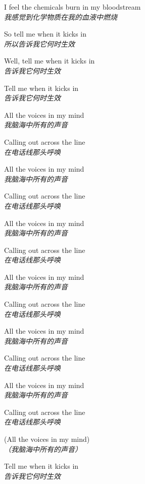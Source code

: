 \begin{spacing}{1.5}
\begin{flushleft}
I feel the chemicals burn in my bloodstream\\
\textit{我感觉到化学物质在我的血液中燃烧}\lyricspace

So tell me when it kicks in\\
\textit{所以告诉我它何时生效}\lyricspace

Well, tell me when it kicks in\\
\textit{告诉我它何时生效}\lyricspace

Tell me when it kicks in\\
\textit{告诉我它何时生效}\lyricspace

All the voices in my mind\\
\textit{我脑海中所有的声音}\lyricspace

Calling out across the line\\
\textit{在电话线那头呼唤}\lyricspace

All the voices in my mind\\
\textit{我脑海中所有的声音}\lyricspace

Calling out across the line\\
\textit{在电话线那头呼唤}\lyricspace

All the voices in my mind\\
\textit{我脑海中所有的声音}\lyricspace

Calling out across the line\\
\textit{在电话线那头呼唤}\lyricspace

All the voices in my mind\\
\textit{我脑海中所有的声音}\lyricspace

Calling out across the line\\
\textit{在电话线那头呼唤}\lyricspace

All the voices in my mind\\
\textit{我脑海中所有的声音}\lyricspace

Calling out across the line\\
\textit{在电话线那头呼唤}\lyricspace

All the voices in my mind\\
\textit{我脑海中所有的声音}\lyricspace

Calling out across the line\\
\textit{在电话线那头呼唤}\lyricspace

(All the voices in my mind)\\
\textit{（我脑海中所有的声音）}\lyricspace

Tell me when it kicks in\\
\textit{告诉我它何时生效}\lyricspace


\end{flushleft}
\end{spacing}
